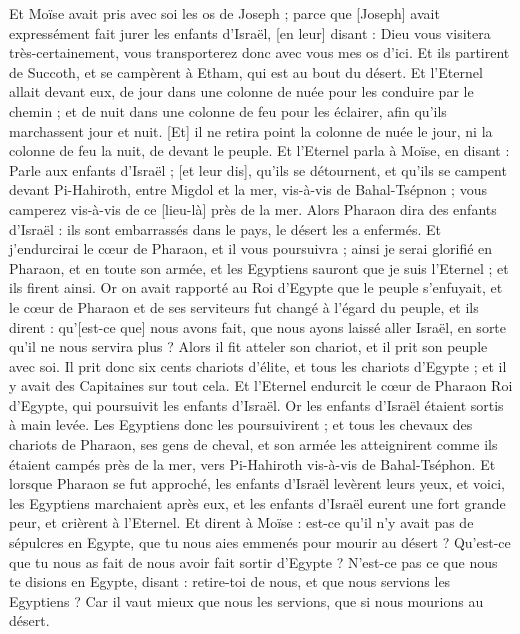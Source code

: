 \begin{multicols}{2}
Et Moïse avait pris avec soi les os de Joseph ; parce que [Joseph] avait expressément fait jurer les enfants d'Israël, [en leur] disant : Dieu vous visitera très-certainement, vous transporterez donc avec vous mes os d'ici.
Et ils partirent de Succoth, et se campèrent à Etham, qui est au bout du désert.
Et l'Eternel allait devant eux, de jour dans une colonne de nuée pour les conduire par le chemin ; et de nuit dans une colonne de feu pour les éclairer, afin qu'ils marchassent jour et nuit.
[Et] il ne retira point la colonne de nuée le jour, ni la colonne de feu la nuit, de devant le peuple.
\VerseOne{}Et l'Eternel parla à Moïse, en disant :
Parle aux enfants d'Israël ; [et leur dis], qu'ils se détournent, et qu'ils se campent devant Pi-Hahiroth, entre Migdol et la mer, vis-à-vis de Bahal-Tsépnon ; vous camperez vis-à-vis de ce [lieu-là] près de la mer.
Alors Pharaon dira des enfants d'Israël : ils sont embarrassés dans le pays, le désert les a enfermés.
Et j'endurcirai le cœur de Pharaon, et il vous poursuivra ; ainsi je serai glorifié en Pharaon, et en toute son armée, et les Egyptiens sauront que je suis l'Eternel ; et ils firent ainsi.
Or on avait rapporté au Roi d'Egypte que le peuple s'enfuyait, et le cœur de Pharaon et de ses serviteurs fut changé à l'égard du peuple, et ils dirent : qu'[est-ce que] nous avons fait, que nous ayons laissé aller Israël, en sorte qu'il ne nous servira plus ?
Alors il fit atteler son chariot, et il prit son peuple avec soi.
Il prit donc six cents chariots d'élite, et tous les chariots d'Egypte ; et il y avait des Capitaines sur tout cela.
Et l'Eternel endurcit le cœur de Pharaon Roi d'Egypte, qui poursuivit les enfants d'Israël. Or les enfants d'Israël étaient sortis à main levée.
Les Egyptiens donc les poursuivirent ; et tous les chevaux des chariots de Pharaon, ses gens de cheval, et son armée les atteignirent comme ils étaient campés près de la mer, vers Pi-Hahiroth vis-à-vis de Bahal-Tséphon.
Et lorsque Pharaon se fut approché, les enfants d'Israël levèrent leurs yeux, et voici, les Egyptiens marchaient après eux, et les enfants d'Israël eurent une fort grande peur, et crièrent à l'Eternel.
Et dirent à Moïse : est-ce qu'il n'y avait pas de sépulcres en Egypte, que tu nous aies emmenés pour mourir au désert ? Qu'est-ce que tu nous as fait de nous avoir fait sortir d'Egypte ?
N'est-ce pas ce que nous te disions en Egypte, disant : retire-toi de nous, et que nous servions les Egyptiens ? Car il vaut mieux que nous les servions, que si nous mourions au désert.

\end{multicols}
